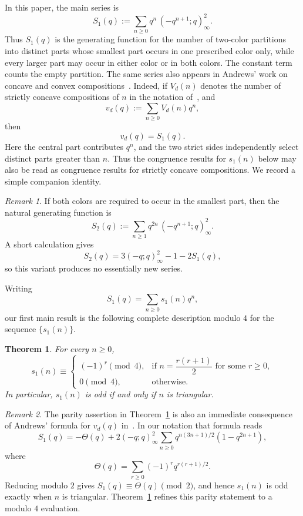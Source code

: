 \documentclass[reqno]{amsart}
\theoremstyle{plain}
\newtheorem{theorem}{Theorem}
\theoremstyle{definition}
\theoremstyle{remark}
\newtheorem{remark}{Remark}
\numberwithin{equation}{section}
\newcommand{\qpoch}[2]{(#1;#2)_\infty}
\begin{document}
In this paper, the main series is
\[
S_1(q):=\sum_{n\ge 0} q^n\,\qpoch{-q^{n+1}}{q}^{2}.
\]
Thus $S_1(q)$ is the generating function for the number of two-color partitions into distinct
parts whose smallest part occurs in one prescribed color only, while every larger part may occur in either color or in both colors.
The constant term counts the empty partition.
The same series also appears in Andrews' work on concave and convex compositions~\cite{AndrewsConcaveConvex}.
Indeed, if $V_d(n)$ denotes the number of strictly concave compositions of $n$ in the notation of~\cite{AndrewsConcaveConvex}, and
\[
v_d(q):=\sum_{n\ge 0}V_d(n)q^n,
\]
then
\[
v_d(q)=S_1(q).
\]
Here the central part contributes $q^n$, and the two strict sides independently select distinct parts greater than $n$.
Thus the congruence results for $s_1(n)$ below may also be read as congruence results for strictly concave compositions.
We record a simple companion identity.
%
\begin{remark}\label{rem:both-smallest}
If both colors are required to occur in the smallest part, then the natural generating function is
\[
S_2(q):=\sum_{n\ge 1} q^{2n}\,\qpoch{-q^{n+1}}{q}^{2}.
\]
A short calculation gives
\[
S_2(q)=3(-q;q)_\infty^2-1-2S_1(q),
\]
so this variant produces no essentially new series.
\end{remark}
Writing
\[
S_1(q) = \sum_{n\geq 0} s_1(n) q^n,
\]
our first main result is the following complete description modulo $4$ for the sequence $\{s_1(n)\}$.
\begin{theorem}\label{thm:mod4}
For every $n\ge 0$,
\[
s_1(n)\equiv
\begin{cases}
(-1)^r \pmod{4}, & \text{if } n=\dfrac{r(r+1)}{2} \text{ for some } r\ge 0, \\
0 \pmod{4}, & \text{otherwise.}
\end{cases}
\]
In particular, $s_1(n)$ is odd if and only if $n$ is triangular.
\end{theorem}

\begin{remark}\label{rem:parity-from-andrews}
The parity assertion in Theorem~\ref{thm:mod4} is also an immediate consequence of Andrews' formula for $v_d(q)$ in~\cite[Theorem~1, (1.4)]{AndrewsConcaveConvex}.
In our notation that formula reads
\[
S_1(q)=-\Theta(q)+2(-q;q)_\infty^2
\sum_{n\ge 0}q^{n(3n+1)/2}(1-q^{2n+1}),
\]
where
\[
\Theta(q)=\sum_{r\ge 0}(-1)^rq^{r(r+1)/2}.
\]
Reducing modulo $2$ gives $S_1(q)\equiv\Theta(q)\pmod{2}$, and hence $s_1(n)$ is odd exactly when $n$ is triangular.
Theorem~\ref{thm:mod4} refines this parity statement to a modulo $4$ evaluation.
\end{remark}
\end{document}
